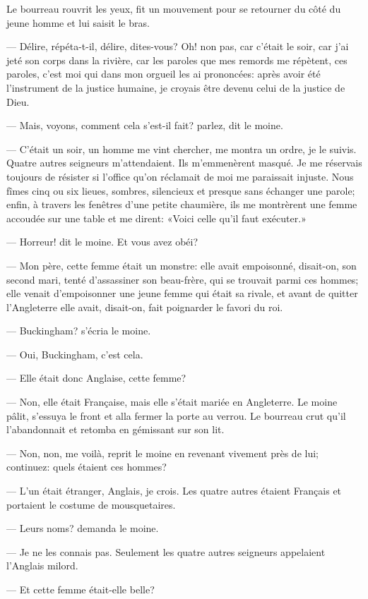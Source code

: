 Le bourreau rouvrit les yeux, fit un mouvement pour se retourner du côté du jeune homme et lui saisit le bras.

— Délire, répéta-t-il, délire, dites-vous? Oh! non pas, car c'était le soir, car j'ai jeté son corps dans la rivière, car les paroles que mes remords me répètent, ces paroles, c'est moi qui dans mon orgueil les ai prononcées: après avoir été l'instrument de la justice humaine, je croyais être devenu celui de la justice de Dieu.

— Mais, voyons, comment cela s'est-il fait? parlez, dit le moine.

— C'était un soir, un homme me vint chercher, me montra un ordre, je le suivis. Quatre autres seigneurs m'attendaient. Ils m'emmenèrent masqué. Je me réservais toujours de résister si l'office qu'on réclamait de moi me paraissait injuste. Nous fîmes cinq ou six lieues, sombres, silencieux et presque sans échanger une parole; enfin, à travers les fenêtres d'une petite chaumière, ils me montrèrent une femme accoudée sur une table et me dirent: «Voici celle qu'il faut exécuter.»

— Horreur! dit le moine. Et vous avez obéi?

— Mon père, cette femme était un monstre: elle avait empoisonné, disait-on, son second mari, tenté d'assassiner son beau-frère, qui se trouvait parmi ces hommes; elle venait d'empoisonner une jeune femme qui était sa rivale, et avant de quitter l'Angleterre elle avait, disait-on, fait poignarder le favori du roi.

— Buckingham? s'écria le moine.

— Oui, Buckingham, c'est cela.

— Elle était donc Anglaise, cette femme?

— Non, elle était Française, mais elle s'était mariée en Angleterre.
Le moine pâlit, s'essuya le front et alla fermer la porte au verrou. Le bourreau crut qu'il l'abandonnait et retomba en gémissant sur son lit.

— Non, non, me voilà, reprit le moine en revenant vivement près de lui; continuez: quels étaient ces hommes?

— L'un était étranger, Anglais, je crois. Les quatre autres étaient Français et portaient le costume de mousquetaires.

— Leurs noms? demanda le moine.

— Je ne les connais pas. Seulement les quatre autres seigneurs appelaient l'Anglais milord.

— Et cette femme était-elle belle?

